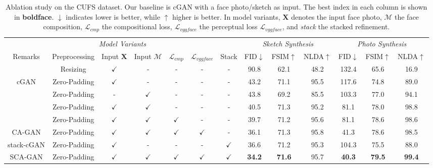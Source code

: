 \documentclass[journal]{IEEEtran}
\begin{document}
\begin{table*}
\centering
\caption{Ablation study on the CUFS dataset. Our baseline is cGAN with a face photo/sketch as input. The best index in each column is shown in \textbf{boldface}. $\downarrow$ indicates lower is better, while $\uparrow$ higher is better. In model variants, $\mathbf{X}$ denotes the input face photo, $\mathcal{M}$ the face composition,  $\mathcal{L}_{cmp}$ the compositional loss, $\mathcal{L}_{vggface}$ the perceptual loss $\mathcal{L}_{vggface}$, and \textit{stack} the stacked refinement.}
\footnotesize
\label{tab:ablation}
\begin{tabular}{c|cccccc|ccc|ccc}
\toprule
\multicolumn{7}{c|}{\textit{Model Variants}}					&	\multicolumn{3}{c|}{\textit{Sketch Synthesis}}					&	\multicolumn{3}{c}{\textit{Photo Synthesis}}					\\	
Remarks	& Preprocessing	&	Input $\mathbf{X}$	&	Input $\mathcal{M}$	&	$\mathcal{L}_{cmp}$	&	$\mathcal{L}_{vggface} $	&	Stack	&	FID$\downarrow$	&	FSIM$\uparrow$	&	NLDA$\uparrow$	&	FID$\downarrow$	&	FSIM$\uparrow$	&	NLDA$\uparrow$	\\	
\midrule
& Resizing &	$\checkmark$	&	-	&	-	&	-	&	-	&	90.8 	&	62.1	&	48.2 	&	132.4 	&	65.6	&	16.9 	\\
cGAN	& Zero-Padding &	$\checkmark$	&	-	&	-	&	-	&	-	&	43.2	&	71.1	&	95.5	&	117.6	&	74.8	&	89.0	\\	
	& Zero-Padding &	-	&	$\checkmark$	&	-	&	-	&	-	&	43.8	&	69.2	&	85.5	&	103.3	&	77.0	&	94.1	\\	& Zero-Padding &	$\checkmark$	&	$\checkmark$	&	-	&	-	&	-	&	40.5	&	71.3	&	95.2	&	81.1	&	78.0	&	98.8	\\	
& Zero-Padding &	$\checkmark$	&	$\checkmark$	&	$\checkmark$	&	-	&	-	&	39.7	&	71.2	&	95.6	&	81.1	&	78.6	&	98.6	\\	
CA-GAN	& Zero-Padding &	$\checkmark$	&	$\checkmark$	&	$\checkmark$	&	$\checkmark$	&	-	&	36.1 
&	71.3 &	95.8 &	41.3	&	78.6	&	98.5 	\\	

\midrule
stack-cGAN	& Zero-Padding &	$\checkmark$	&	-	&	-	&	-	&	$\checkmark$	&	36.6	&	71.2	&	95.3	&	104.3	&	75.5	&	88.0	\\	SCA-GAN	& Zero-Padding &	$\checkmark$	&	$\checkmark$	&	$\checkmark$	&	$\checkmark$	&	$\checkmark$	&	\textbf{34.2}	&	\textbf{71.6}	&	95.7	&	\textbf{40.3} & \textbf{79.5}	&	\textbf{99.4} 	\\	
\bottomrule	
\end{tabular}
\vspace{-0.2cm}
\end{table*}
\end{document}

